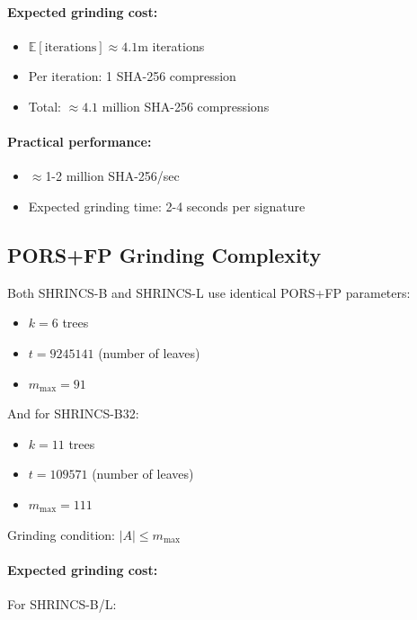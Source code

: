 \paragraph{Expected grinding cost:}
\begin{itemize}
    \item $\mathbb{E}[\text{iterations}] \approx 4.1$m iterations
    \item Per iteration: 1 SHA-256 compression
    \item Total: $\approx 4.1$ million SHA-256 compressions
\end{itemize}

\paragraph{Practical performance:}
\begin{itemize}
    \item  $\approx$1-2 million SHA-256/sec
    \item Expected grinding time: 2-4 seconds per signature
\end{itemize}

\subsection{PORS+FP Grinding Complexity}
Both SHRINCS-B and SHRINCS-L use identical PORS+FP parameters:
\begin{itemize}
    \item $k = 6$ trees
    \item $t = 9245141$ (number of leaves)
    \item $m_{\max} = 91$
\end{itemize}

And for SHRINCS-B32:

\begin{itemize}
    \item $k = 11$ trees
    \item $t = 109571$ (number of leaves)
    \item $m_{\max} = 111$
\end{itemize}

Grinding condition: $|A| \le m_{\max}$

\paragraph{Expected grinding cost:}

For SHRINCS-B/L:

